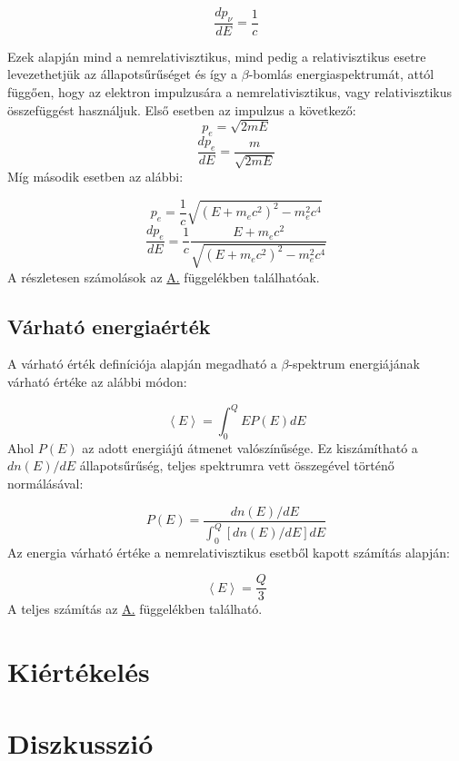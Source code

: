 \begin{multicols}{2}
\begin{enumerate}
\begin{equation} \label{eq:11}
\frac{dp_{\nu}}{dE}
=
\frac{1}{c}
\end{equation}

\end{enumerate}
Ezek alapján mind a nemrelativisztikus, mind pedig a relativisztikus esetre levezethetjük az állapotsűrűséget és így a $\beta$-bomlás energiaspektrumát, attól függően, hogy az elektron impulzusára a nemrelativisztikus, vagy relativisztikus összefüggést használjuk. Első esetben az impulzus a következő:
\begin{equation} \label{eq:12}
p_{e}
=
\sqrt{2mE}
\end{equation}
\begin{equation} \label{eq:13}
\frac{dp_{e}}{dE}
=
\frac{m}{\sqrt{2mE}}
\end{equation}
Míg második esetben az alábbi:

\begin{equation} \label{eq:14}
p_{e}
=
\frac{1}{c} \sqrt{\left( E + m_{e} c^2 \right)^2 - m_{e}^{2} c^{4}}
\end{equation}
\begin{equation} \label{eq:15}
\frac{dp_{e}}{dE}
=
\frac{1}{c} \frac{E + m_{e} c^2}{\sqrt{\left( E + m_{e} c^2 \right)^2 - m_{e}^{2} c^{4}}}
\end{equation}
A részletesen számolások az \hyperref[appendix:A]{A.} függelékben találhatóak.

\subsection{Várható energiaérték}
A várható érték definíciója alapján megadható a $\beta$-spektrum energiájának várható értéke az alábbi módon:

\begin{equation} \label{eq:16}
\left< E \right>
=
\int_{0}^{Q} E P \left( E \right) dE
\end{equation}
Ahol $P \left( E \right)$ az adott energiájú átmenet valószínűsége. Ez kiszámítható a $dn \left( E \right)/dE$ állapotsűrűség, teljes spektrumra vett összegével történő normálásával:

\begin{equation} \label{eq:17}
P \left( E \right)
=
\frac{dn \left( E \right) / dE}{\int_{0}^{Q} \left[ dn \left( E \right) / dE \right] dE}
\end{equation}
Az energia várható értéke a nemrelativisztikus esetből kapott számítás alapján:

\begin{equation} \label{eq:18}
\left< E \right>
=
\frac{Q}{3}
\end{equation}
A teljes számítás az \hyperref[appendix:A]{A.} függelékben található.

\section{Kiértékelés}


\section{Diszkusszió}


\end{multicols}